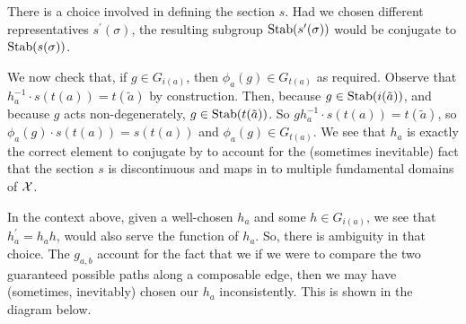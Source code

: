There is a choice involved in defining the section $s$.
Had we chosen different representatives $s^\prime(\sigma)$, the resulting  subgroup $\operatorname{Stab}(s^\prime(\sigma))$ would be conjugate to $\operatorname{Stab}(s(\sigma))$.

We now check that, if $g \in G_{i(a)}$, then  $\phi_a(g) \in G_{t(a)}$ as required.
Observe that $h_a^{-1} \cdot s(t(a)) = t(\tilde{a})$ by construction.
Then, because $g \in \operatorname{Stab}(i(\tilde{a}))$,  and because  $g$ acts non-degenerately,  $g \in \operatorname{Stab}(t(\tilde{a}))$.
So  $gh_a^{-1} \cdot s(t(a)) = t(\tilde{a})$, so $\phi_a(g) \cdot s(t(a)) = s(t(a))$ and  $\phi_a(g) \in G_{t(a)}$.
We see that $h_a$ is exactly the correct element to conjugate by to account for the (sometimes inevitable) fact that the section $s$ is discontinuous and maps in to multiple fundamental domains of $\mathcal{X}$.

In the context above, given a well-chosen $h_a$ and some $h \in G_{i(a)}$, we see that $h^\prime_a = h_ah$, would also serve the function of $h_a$.
So, there is ambiguity in that choice.
The $g_{a,b}$ account for the fact that we if we were to compare the two guaranteed possible paths along a composable edge, then we may have (sometimes, inevitably) chosen our $h_a$ inconsistently.
This is shown in the diagram below.

\begin{center}
\end{center}

